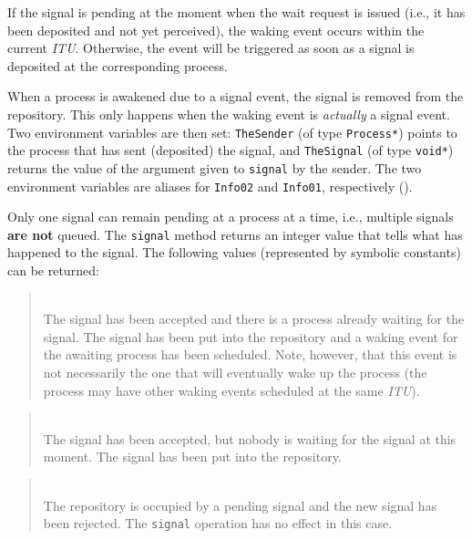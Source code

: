 If the signal is pending at the moment when the wait request
is issued (i.e., it has been deposited and not yet perceived),
the waking event occurs within the current {\em ITU}.
Otherwise, the event will be triggered as soon as a signal is deposited
at the corresponding process.

When a process is awakened due to a signal event, the signal is removed
from the repository.
This only happens when the waking event is {\em actually\/} a signal event.
Two environment variables are then set:
{\tt TheSender} (of type {\tt Process*}) points to the process that has sent
(deposited) the signal, and {\tt TheSignal} (of type {\tt void*}) returns
the value of the argument given to {\tt signal} by the sender.
The two environment variables are aliases for {\tt Info02} and
{\tt Info01}, respectively ().

Only one signal can remain pending at a process at a time, i.e., multiple
signals {\bf are not} queued.
The {\tt signal} method returns an integer value that tells what has happened
to the signal.
The following values (represented by symbolic constants) can be
returned:

\medskip

\begin{quote}
\noindent{}\\ \hspace{0in}
The signal has been accepted and there is a process already
waiting for the signal.
The signal has been put into the repository and a waking event for the
awaiting process has been scheduled.
Note, however,
that this event is not necessarily the one that will eventually wake up
the process (the process may have other waking events scheduled at the
same {\em ITU\/}).
\end{quote}

\begin{quote}
\noindent{}\\ \hspace{0in}
The signal has been accepted, but nobody is waiting for the signal at this
moment.
The signal has been put into the repository.
\end{quote}

\begin{quote}
\noindent{}\\ \hspace{0in}
The repository is occupied by a pending signal and the new signal has been
rejected.
The {\tt signal} operation has no effect in this case.
\end{quote}\medskip

